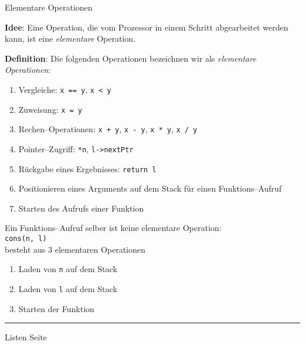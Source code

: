 \begin{slide}{}
\normalsize

\begin{center}
Elementare Operationen
\end{center}
\vspace*{0.5cm}

\footnotesize
\textbf{Idee}: Eine Operation, die vom Prozessor in einem Schritt abgearbeitet werden kann,
ist eine \emph{elementare} Operation.

\textbf{Definition}:  Die folgenden Operationen bezeichnen wir als 
\emph{elementare Operationen}:
\begin{enumerate}
\item Vergleiche: \hspace*{\fill} \texttt{x == y}, \texttt{x < y}
\item Zuweisung:  \hspace*{\fill} \texttt{x = y}
\item Rechen--Operationen:  \hspace*{\fill} \texttt{x + y}, \texttt{x - y}, \texttt{x * y}, \texttt{x / y}
\item Pointer--Zugriff: \hspace*{\fill} \texttt{*n}, \texttt{l->nextPtr}
\item R\"uckgabe eines Ergebnisses: \hspace*{\fill} \texttt{return l}
\item Positionieren eines Arguments auf dem Stack f\"ur einen Funktions--Aufruf
\item Starten des Aufrufs einer Funktion
\end{enumerate}
    Ein Funktions--Aufruf selber ist keine elementare Operation: \\[0.3cm]
\hspace*{1.3cm} \texttt{cons(n, l)} \\[0.3cm]
besteht aus 3 elementaren Operationen
\begin{enumerate}
\item Laden von \texttt{n} auf dem Stack
\item Laden von \texttt{l} auf dem Stack
\item Starten der Funktion
\end{enumerate}


\vspace*{\fill}
\tiny \addtocounter{mypage}{1}
\rule{17cm}{1mm}
Listen  \hspace*{\fill} Seite 
\end{slide}

